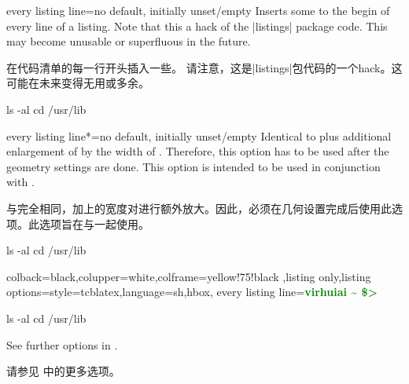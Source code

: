 \begin{docTcbKey}{every listing line}{=}{no default, initially unset/empty}
Inserts some  to the begin of every line of a listing.
Note that this a hack of the |listings| package code. This may become unusable
or superfluous in the future.

在代码清单的每一行开头插入一些。 请注意，这是|listings|包代码的一个hack。这可能在未来变得无用或多余。
\begin{dispExample}

\begin{commandshell}
ls -al
cd /usr/lib
\end{commandshell}
\end{dispExample}
\end{docTcbKey}


\begin{docTcbKey}{every listing line*}{=}{no default, initially unset/empty}
Identical to  plus additional enlargement
of  by the width of . Therefore, this
option has to be used after the geometry settings are done.
This option is intended to be used in conjunction with .

与完全相同，加上的宽度对进行额外放大。因此，必须在几何设置完成后使用此选项。此选项旨在与一起使用。
\begin{dispExample}

\begin{commandshell}
ls -al
cd /usr/lib
\end{commandshell}
\end{dispExample}

\begin{dispExample}
%
{colback=black,colupper=white,colframe=yellow!75!black%
,listing only,listing options={style=tcblatex,language=sh},hbox,
every listing line={\textcolor{green}{\small\ttfamily\bfseries virhuiai \textasciitilde{} \$> }}}

\begin{commandshell}
ls -al
cd /usr/lib
\end{commandshell}
\end{dispExample}
\end{docTcbKey}

See further options in .

请参见  中的更多选项。

